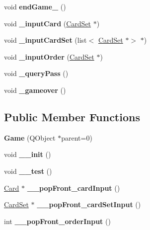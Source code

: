 \begin{DoxyCompactItemize}
void {\bfseries end\+Game\+\_\+} ()
\item 
\mbox{\label{class_game_a68434e8fd97ea4ced1b66800f6f28cba}} 
void {\bfseries \+\_\+input\+Card} (\hyperlink{class_card_set}{Card\+Set} $\ast$)
\item 
\mbox{\label{class_game_ad05a31ab4777b0dc195a58c9451002de}} 
void {\bfseries \+\_\+input\+Card\+Set} (list$<$ \hyperlink{class_card_set}{Card\+Set} $\ast$$>$ $\ast$)
\item 
\mbox{\label{class_game_a9684a513c8de2ce34f918925d6db5152}} 
void {\bfseries \+\_\+input\+Order} (\hyperlink{class_card_set}{Card\+Set} $\ast$)
\item 
\mbox{\label{class_game_a51f8b19c1fbadff3bb6110a0838f41d1}} 
void {\bfseries \+\_\+query\+Pass} ()
\item 
\mbox{\label{class_game_a042b23c59b55a8e1bfb037d323985655}} 
void {\bfseries \+\_\+gameover} ()
\end{DoxyCompactItemize}
\subsection*{Public Member Functions}
\begin{DoxyCompactItemize}
\item 
\mbox{\label{class_game_a1875963fc898101a29d47084aebffa28}} 
{\bfseries Game} (Q\+Object $\ast$parent=0)
\item 
\mbox{\label{class_game_a3ff63bc03af3e579bada089f42d0c133}} 
void {\bfseries \+\_\+\+\_\+init} ()
\item 
\mbox{\label{class_game_ae5cfc450417808cdcb76cf48c8ff072a}} 
void {\bfseries \+\_\+\+\_\+test} ()
\item 
\mbox{\label{class_game_ae631dec4007607be119441ee2a8baa26}} 
\hyperlink{class_card}{Card} $\ast$ {\bfseries \+\_\+\+\_\+pop\+Front\+\_\+card\+Input} ()
\item 
\mbox{\label{class_game_ac2b080efeb6aab8aa7d176f2fa051a5e}} 
\hyperlink{class_card_set}{Card\+Set} $\ast$ {\bfseries \+\_\+\+\_\+pop\+Front\+\_\+card\+Set\+Input} ()
\item 
\mbox{\label{class_game_a3735b6e5a4c2c08058e748962e01413f}} 
int {\bfseries \+\_\+\+\_\+pop\+Front\+\_\+order\+Input} ()
\end{DoxyCompactItemize}
